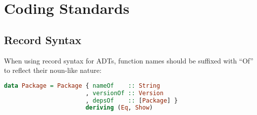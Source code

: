 \documentclass{article}
\begin{document}
\section{Coding Standards}\label{coding-standards}

\subsection{Record Syntax}\label{record-syntax}

When using record syntax for ADTs, function names should be suffixed
with ``Of'' to reflect their noun-like nature:

\begin{shaded}
\begin{lstlisting}[language=haskell]
data Package = Package { nameOf    :: String
                       , versionOf :: Version
                       , depsOf    :: [Package] }
                       deriving (Eq, Show)
\end{lstlisting}
\end{shaded}
\end{document}
